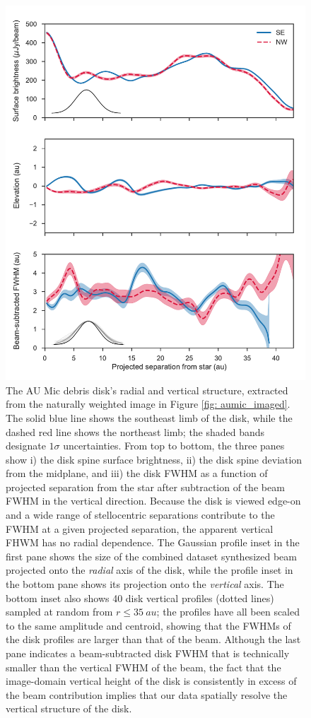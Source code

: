\documentclass[modern]{aastex62}
\begin{document}
\begin{figure}
    \centering
    \includegraphics[width=.7\linewidth]{../figures/boccaletti_plots}
    \caption{The AU Mic debris disk's radial and vertical structure, extracted from the naturally weighted image in Figure \ref{fig: aumic_imaged}. 
    The solid blue line shows the southeast limb of the disk, while the dashed red line shows the northeast limb; the shaded bands designate $1\sigma$ uncertainties.
    From top to bottom, the three panes show i) the disk spine surface brightness, ii) the disk spine deviation from the midplane, and iii) the disk FWHM as a function of projected separation from the star after subtraction of the beam FWHM in the vertical direction. 
    Because the disk is viewed edge-on and a wide range of stellocentric separations contribute to the FWHM at a given projected separation, the apparent vertical FHWM has no radial dependence.
    The Gaussian profile inset in the first pane shows the size of the combined dataset synthesized beam projected onto the \textit{radial} axis of the disk, while the profile inset in the bottom pane shows its projection onto the \textit{vertical} axis.
    The bottom inset also shows 40 disk vertical profiles (dotted lines) sampled at random from $r \leq \SI{35}{au}$; the profiles have all been scaled to the same amplitude and centroid, showing that the FWHMs of the disk profiles are larger than that of the beam.
    Although the last pane indicates a beam-subtracted disk FWHM that is technically smaller than the vertical FWHM of the beam, the fact that the image-domain vertical height of the disk is consistently in excess of the beam contribution implies that our data spatially resolve the vertical structure of the disk.
    }
    \label{fig: boccaletti}
\end{figure}
\end{document}
